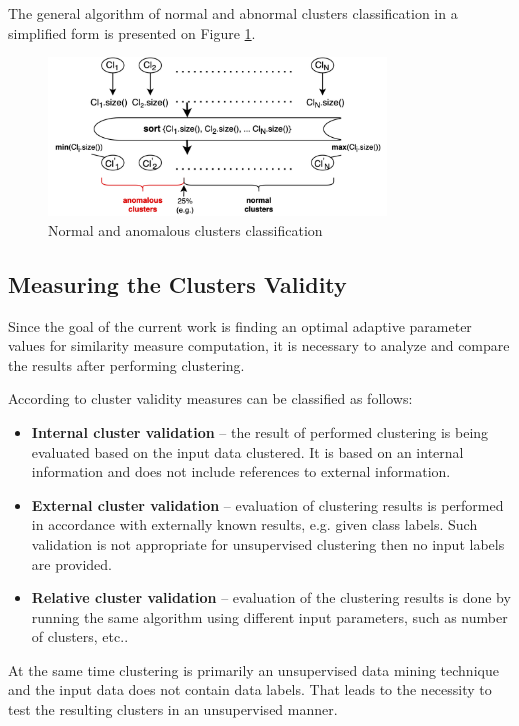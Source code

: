 The general algorithm of normal and abnormal clusters classification in a simplified form is presented on Figure \ref{fig:cl-classif}.

\begin{figure}[!htb]
	\centering{}
	\includegraphics[width=0.8\textwidth]{images/cl-classif.png}
	\caption{Normal and anomalous clusters classification}
	\label{fig:cl-classif}
\end{figure}

\subsection{Measuring the Clusters Validity}

Since the goal of the current work is finding an optimal adaptive parameter values for similarity measure computation, it is necessary to analyze and compare the results after performing clustering. 

According to \cite{online:dunn_cl_valid} cluster validity measures can be classified as follows:

\begin{itemize}
	\setlength\itemsep{0em}
	\item \textbf{Internal cluster validation} -- the result of performed clustering is being evaluated based on the input data clustered. It is based on an internal information and does not include references to external information.
	\item \textbf{External cluster validation} -- evaluation of clustering results is performed in accordance with externally known results, e.g. given class labels. Such validation is not appropriate for unsupervised clustering then no input labels are provided.
	\item \textbf{Relative cluster validation} -- evaluation of the clustering results is done by running the same algorithm using different input parameters, such as number of clusters, etc..
\end{itemize}

At the same time clustering is primarily an unsupervised data mining technique and the input data does not contain data labels. That leads to the necessity to test the resulting clusters in an unsupervised manner. 

